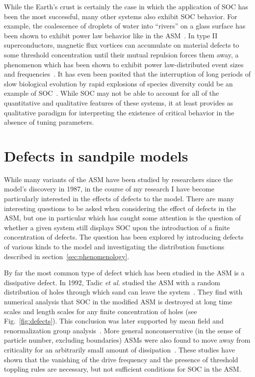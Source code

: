 \documentclass[aps,prb,reprint,superscriptaddress]{revtex4-2}
\begin{document}
While the Earth's crust is certainly the case in which the application of SOC has been the most successful, many other systems also exhibit SOC behavior. For example, the coalescence of droplets of water into ``rivers'' on a glass surface has been shown to exhibit power law behavior like in the ASM~\cite{jensen, plourde_water_1993}. In type II superconductors, magnetic flux vortices can accumulate on material defects to some threshold concentration until their mutual repulsion forces them away, a phenomenon which has been shown to exhibit power law-distributed event sizes and frequencies~\cite{field_superconducting_1995}. It has even been posited that the interruption of long periods of slow biological evolution by rapid explosions of species diversity could be an example of SOC~\cite{raup_biological_1986}. While SOC may not be able to account for all of the quantitative and qualitative features of these systems, it at least provides as qualitative paradigm for interpreting the existence of critical behavior in the absence of tuning parameters.

\section{Defects in sandpile models}

While many variants of the ASM have been studied by researchers since the model's discovery in 1987, in the course of my research I have become particularly interested in the effects of defects to the model. There are many interesting questions to be asked when considering the effect of defects in the ASM, but one in particular which has caught some attention is the question of whether a given system still displays SOC upon the introduction of a finite concentration of defects. The question has been explored by introducing defects of various kinds to the model and investigating the distribution functions described in section~\ref{sec:phenomenology}.

By far the most common type of defect which has been studied in the ASM is a dissipative defect. In 1992, Tadic \textit{et al.} studied the ASM with a random distribution of holes through which sand can leave the system~\cite{tadic_scaling_1992}. They find with numerical analysis that SOC in the modified ASM is destroyed at long time scales and length scales for any finite concentration of holes (see Fig.~\ref{fig:defects}). This conclusion was later supported by mean field and renormalization group analysis~\cite{ghaffari_nonconservative_1997}. More general nonconservative (in the sense of particle number, excluding boundaries) ASMs were also found to move away from criticality for an arbitrarily small amount of dissipation~\cite{tsuchiya_proof_2000}. These studies have shown that the vanishing of the drive frequency and the presence of threshold toppling rules are necessary, but not sufficient conditions for SOC in the ASM.
\end{document}
